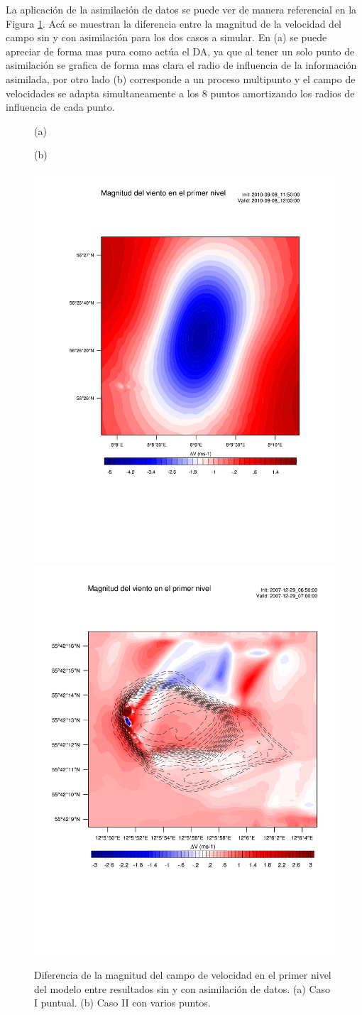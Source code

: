La aplicación de la asimilación de datos se puede ver de manera referencial en la Figura \ref{fig:05_da_expl}. Acá se muestran la diferencia entre la magnitud de la velocidad del campo sin y con asimilación para los dos casos a simular. En (a) se puede apreciar de forma mas pura como actúa el DA, ya que al tener un solo punto de asimilación se grafica de forma mas clara el radio de influencia de la información asimilada, por otro lado (b) corresponde a un proceso multipunto y el campo de velocidades se adapta simultaneamente a los 8 puntos amortizando los radios de influencia de cada punto.
\begin{figure}[H]
	\centering
	\begin{minipage}{0.5\linewidth}
		\center\hspace{0.3cm}(a)
	\end{minipage}%
	\begin{minipage}{0.5\linewidth}
		\center\hspace{0.3cm}(b)
	\end{minipage}%
	
	\includegraphics[width=0.5\linewidth,page=1,trim={2.5cm 6.2cm 1cm 4.5cm},clip]{Imagenes/05/eta1_da_hov}%
	\includegraphics[width=0.5\linewidth,page=1,trim={1.0cm 5.2cm 1cm 4.5cm},clip]{Imagenes/05/eta1_da_bol}%
	\caption{Diferencia de la magnitud del campo de velocidad en el primer nivel del modelo entre resultados sin y con asimilación de datos. (a) Caso I puntual. (b) Caso II con varios puntos.}
	\label{fig:05_da_expl}
\end{figure}
\newpage
